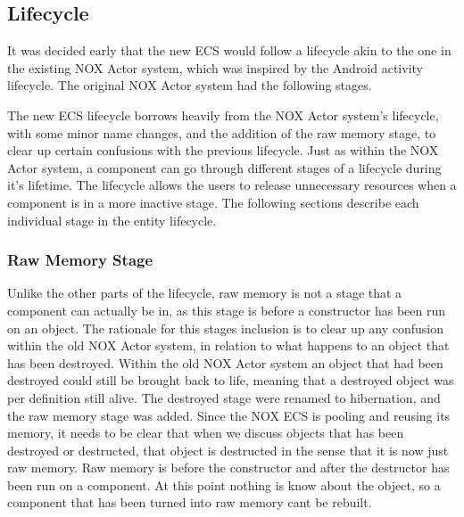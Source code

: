 \subsection{Lifecycle}
\label{subsec:high_level_lifecycle}
It was decided early that the new ECS would follow a lifecycle akin to the one in the existing NOX Actor system,
which was inspired by the Android activity lifecycle\cite{android_activity_lifecycle}. 
The original NOX Actor system had the following stages.

The new ECS lifecycle borrows heavily from the NOX Actor system's lifecycle, with some minor name changes,
and the addition of the raw memory stage, to clear up certain confusions with the previous lifecycle.
Just as within the NOX Actor system, a component can go through different stages of a lifecycle during it's lifetime.
The lifecycle allows the users to release unnecessary resources when a component is in a more inactive stage.
The following sections describe each individual stage in the entity lifecycle.


\subsubsection{Raw Memory Stage}
Unlike the other parts of the lifecycle, raw memory is not a stage that a component can actually be in,
as this stage is before a constructor has been run on an object.
The rationale for this stages inclusion is to clear up any confusion within the old NOX Actor system,
in relation to what happens to an object that has been destroyed.
Within the old NOX Actor system an object that had been destroyed could still be brought back to life,
meaning that a destroyed object was per definition still alive.
The destroyed stage were renamed to hibernation, and the raw memory stage was added.
Since the NOX ECS is pooling and reusing its memory, it needs to be clear that when we discuss objects
that has been destroyed or destructed, that object is destructed in the sense that it is now just raw memory.
Raw memory is before the constructor and after the destructor has been run on a component.
At this point nothing is know about the object, so a component that has been turned into raw memory cant be rebuilt.


